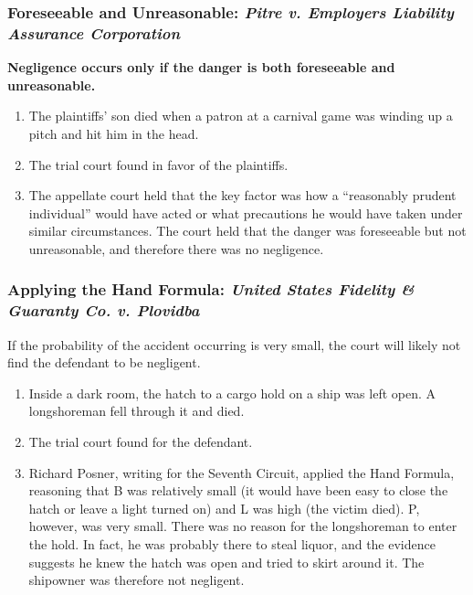 \subsubsection{Foreseeable and Unreasonable: \emph{Pitre v. Employers 
Liability Assurance Corporation}}

\textbf{Negligence occurs only if the danger is both foreseeable and 
unreasonable.} 

\begin{enumerate}
    \item The plaintiffs' son died when a patron at a carnival game was 
    winding up a pitch and hit him in the head.
    \item The trial court found in favor of the plaintiffs.
    \item The appellate court held that the key factor was how a 
    ``reasonably prudent individual'' would have acted or what precautions he 
    would have taken under similar circumstances. The court held 
    that the danger was foreseeable but not unreasonable, and therefore there 
    was no negligence.
\end{enumerate}

\subsubsection{Applying the Hand Formula: \emph{United States Fidelity \& 
Guaranty Co. v. Plovidba}}

If the probability of the accident occurring is very small, the court will 
likely not find the defendant to be negligent.

\begin{enumerate}
    \item Inside a dark room, the hatch to a cargo hold on a ship was left 
    open. A longshoreman fell through it and died.
    \item The trial court found for the defendant.
    \item Richard Posner, writing for the Seventh Circuit, applied the Hand 
    Formula, reasoning that B was relatively small (it would have been easy to 
    close the hatch or leave a light turned on) and L was high (the victim 
    died). P, however, was very small. There was no reason for the 
    longshoreman to enter the hold. In fact, he was probably there to steal 
    liquor, and the evidence suggests he knew the hatch was open and tried to 
    skirt around it. The shipowner was therefore not negligent.
\end{enumerate}
